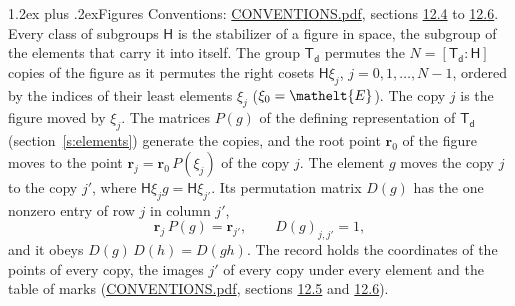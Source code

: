 \documentclass[10pt,a4paper]{article}
\makeatletter
\renewcommand\section{\@startsection{section}{1}{\z@}{-3ex plus -1ex minus -.2ex}%
  {1.2ex plus .2ex}{\normalfont\large\sffamily\bfseries\color{parttitle}}}
\numberwithin{equation}{section}
\newcommand{\eltfont}[1]{{\let\sigma\eltsigma\mathelt{#1}}}
\newcommand{\grp}[1]{\mathsf{#1}}
\newcommand{\cls}[1]{\eltfont{#1}}
\newcommand{\pointr}{\mathbf{r}}
\makeatother
\begin{document}
\section{Figures}\label{s:permutation}
Conventions: \href{../../CONVENTIONS.pdf}{CONVENTIONS.pdf}, sections \href{../../CONVENTIONS.pdf\#conv.12.4}{12.4} to \href{../../CONVENTIONS.pdf\#conv.12.6}{12.6}.
Every class of subgroups $\grp{H}$ is the stabilizer of a figure in space, the subgroup of the elements that carry it into itself. \label{n:local.orbit.size}The group $\grp{T_{d}}$ permutes the $N = [\grp{T_{d}} : \grp{H}]$ copies of the figure as it permutes the right cosets $\grp{H}\xi_j$, $j = 0, 1, \dots, N - 1$, ordered by the indices of their least elements $\xi_j$ ($\xi_0 = \cls{E}$). The copy $j$ is the figure moved by $\xi_j$. The matrices $P(g)$ of the defining representation of $\grp{T_{d}}$ (section~\ref{s:elements}) generate the copies, and the root point $\pointr_0$ of the figure moves to the point $\pointr_j = \pointr_0\, P(\xi_j)$ of the copy $j$. The element $g$ moves the copy $j$ to the copy $j'$, where $\grp{H}\xi_j g = \grp{H}\xi_{j'}$. \label{n:local.matrix.permutation}Its permutation matrix $D(g)$ has the one nonzero entry of row $j$ in column $j'$,
\begin{equation}\label{e:perm.matrix}\pointr_j\, P(g) = \pointr_{j'}, \qquad D(g)_{j,j'} = 1,\end{equation}
and it obeys $D(g)\, D(h) = D(gh)$. The record holds the coordinates of the points of every copy, the images $j'$ of every copy under every element and the table of marks (\href{../../CONVENTIONS.pdf}{CONVENTIONS.pdf}, sections \href{../../CONVENTIONS.pdf\#conv.12.5}{12.5} and \href{../../CONVENTIONS.pdf\#conv.12.6}{12.6}).
\end{document}
